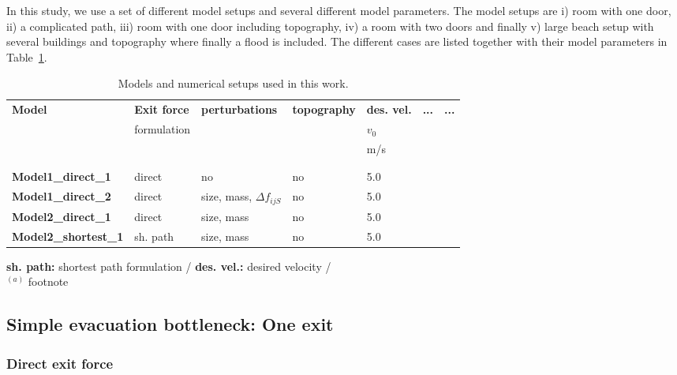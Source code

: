 \documentclass[11pt]{article}
\begin{document}
In this study, we use a set of different model setups and several different model parameters. The model setups are i) room with one door, ii) a complicated path, iii) room with one door including topography, iv) a room with two doors and finally v) large beach setup with several buildings and topography where finally a flood is included. The different cases are listed together with their model parameters in Table~\ref{tab:Parameters}.


\begin{landscape}
\begin{table}  
	 \begin{footnotesize}
	\caption{Models and numerical setups used in this work.}
	\label{tab:Parameters}
	\begin{tabular}{p{2.9cm} p{2.0cm} p{2.5cm} p{2.0cm} p{2.0cm} p{2.0cm} p{2.0cm} }
	\hline
	 \textbf{Model} & \textbf{Exit force} & \textbf{perturbations} & \textbf{topography} & \textbf{des. vel.} & \textbf{...} & \textbf{...}\\
	 & formulation & & & $v_{0}$    \\
	 & & & & m/s &   \\
	\hline
		&  \\
			&   \\
	\hline
	{\bf Model1\_direct\_1}	& direct 	& no			& no	& 5.0 & 			\\
	{\bf Model1\_direct\_2}	& direct 	& size, mass, $\Delta f_{ijS}$ 	& no 	& 5.0 &		\\
	{\bf Model2\_direct\_1}	& direct 	& size, mass 	& no 	& 5.0	 &				\\
	{\bf Model2\_shortest\_1}	& sh. path & size, mass 	& no 	& 5.0	 &			\\
	\hline
	\end{tabular}
	
	{\bf sh. path:} shortest path formulation / {\bf des. vel.:} desired velocity /    \\
	$^{(a)}$ footnote
	\end{footnotesize}
\end{table}
\end{landscape}



\subsection{Simple evacuation bottleneck: One exit}

\subsubsection{Direct exit force}
\end{document}
